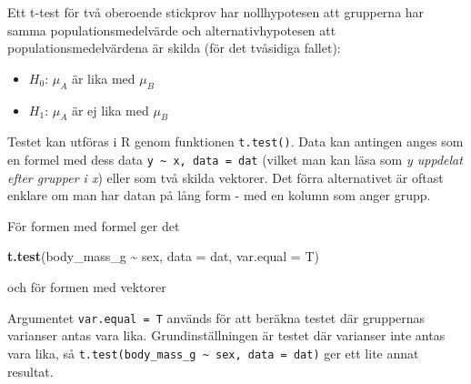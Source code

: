 \documentclass[
]{book}
\newenvironment{Shaded}{\begin{snugshade}}{\end{snugshade}}
\newcommand{\AttributeTok}[1]{\textcolor[rgb]{0.13,0.29,0.53}{#1}}
\newcommand{\FunctionTok}[1]{\textcolor[rgb]{0.13,0.29,0.53}{\textbf{#1}}}
\newcommand{\NormalTok}[1]{#1}
\newcommand{\OtherTok}[1]{\textcolor[rgb]{0.56,0.35,0.01}{#1}}
\newcommand{\SpecialCharTok}[1]{\textcolor[rgb]{0.81,0.36,0.00}{\textbf{#1}}}
\newcommand{\StringTok}[1]{\textcolor[rgb]{0.31,0.60,0.02}{#1}}
\providecommand{\tightlist}{%
  \setlength{\itemsep}{0pt}\setlength{\parskip}{0pt}}
\theoremstyle{definition}
\theoremstyle{definition}
\theoremstyle{definition}
\theoremstyle{definition}
\theoremstyle{remark}
\begin{document}
Ett t-test för två oberoende stickprov har nollhypotesen att grupperna har samma populationsmedelvärde och alternativhypotesen att populationsmedelvärdena är skilda (för det tvåsidiga fallet):

\begin{itemize}
\tightlist
\item
  \(H_0\): \(\mu_A\) är lika med \(\mu_B\)
\item
  \(H_1\): \(\mu_A\) är ej lika med \(\mu_B\)
\end{itemize}

Testet kan utföras i R genom funktionen \texttt{t.test()}. Data kan antingen anges som en formel med dess data \texttt{y\ \textasciitilde{}\ x,\ data\ =\ dat} (vilket man kan läsa som \emph{y uppdelat efter grupper i x}) eller som två skilda vektorer. Det förra alternativet är oftast enklare om man har datan på lång form - med en kolumn som anger grupp.

För formen med formel ger det

\begin{Shaded}
\begin{Highlighting}[]
\FunctionTok{t.test}\NormalTok{(body\_mass\_g }\SpecialCharTok{\textasciitilde{}}\NormalTok{ sex, }\AttributeTok{data =}\NormalTok{ dat, }\AttributeTok{var.equal =}\NormalTok{ T)}
\end{Highlighting}
\end{Shaded}

och för formen med vektorer

\begin{Shaded}
\end{Shaded}

Argumentet \texttt{var.equal\ =\ T} används för att beräkna testet där gruppernas varianser antas vara lika. Grundinställningen är testet där varianser inte antas vara lika, så \texttt{t.test(body\_mass\_g\ \textasciitilde{}\ sex,\ data\ =\ dat)} ger ett lite annat resultat.
\end{document}
